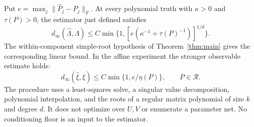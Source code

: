 \begin{theorem}\label{thm:algorithm}
Put $e=\max_j\|\widehat P_j-P_j\|_F$.
At every polynomial truth with $\kappa>0$ and $\tau(P)>0$, the
estimator just defined satisfies
\begin{equation}\label{eq:algorithm-poly}
 d_\infty(\widehat\Lambda,\Lambda)
 \le C\min\{1,[e(\kappa^{-1}+\tau(P)^{-1})]^{1/d}\}.
\end{equation}
The within-component simple-root hypothesis of Theorem~\ref{thm:main}
gives the corresponding linear bound. In the affine experiment the
stronger observable estimate holds:
\begin{equation}\label{eq:algorithm-affine}
 d_\infty(\widehat\xi,\xi)
                    \le C\min\{1,e/\eta(P)\},\qquad P\in\mathcal R.
\end{equation}
The procedure uses a least-squares solve, a singular value decomposition,
polynomial interpolation, and the roots of a regular matrix polynomial
of size $k$ and degree $d$. It does not optimize over $U,V$ or enumerate
a parameter net. No conditioning floor is an input to the estimator.
\end{theorem}
